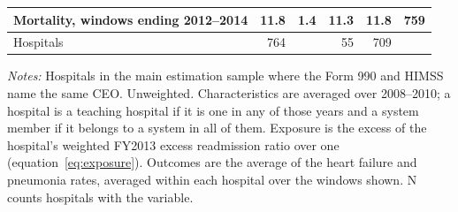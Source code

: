 \begin{table}
\begin{threeparttable}
\begin{tabular}[t]{lrrrrr}
\hspace{1em}Mortality, windows ending 2012--2014 & 11.8 & 1.4 & 11.3 & 11.8 & 759\\
\midrule
Hospitals & 764 &  & 55 & 709 & \\
\bottomrule
\end{tabular}
\begin{tablenotes}[flushleft]
\footnotesize
\item \textit{Notes:} Hospitals in the main estimation sample where the Form 990 and HIMSS name the same CEO. Unweighted. Characteristics are averaged over 2008--2010; a hospital is a teaching hospital if it is one in any of those years and a system member if it belongs to a system in all of them. Exposure is the excess of the hospital's weighted FY2013 excess readmission ratio over one (equation~\ref{eq:exposure}). Outcomes are the average of the heart failure and pneumonia rates, averaged within each hospital over the windows shown. N counts hospitals with the variable.
\end{tablenotes}
\end{threeparttable}
\end{table}
